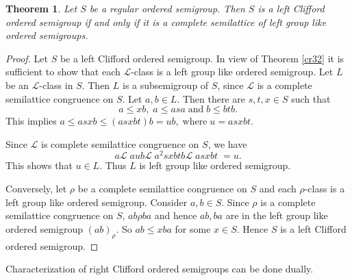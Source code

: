 \documentclass[13pt]{article}
\newtheorem{Theorem}[theorem]{Theorem}
\theoremstyle{definition}
\theoremstyle{remark}
\numberwithin{equation}{section}
\newcommand{\lc}{\mathcal{L}}
\begin{document}
\begin{Theorem}\label{cr33}
Let $S$ be a regular ordered  semigroup. Then $S$ is  a left
Clifford ordered semigroup if and only if it is a complete
semilattice of left group like ordered semigroups.
\end{Theorem}
\begin{proof}
Let $S$ be a  left Clifford ordered semigroup. In view of Theorem
\ref{cr32} it is sufficient to show that  each  $\lc$-class is a
left group like ordered semigroup. Let $L$ be an $\lc$-class in $S$.
Then $L$ is a subsemigroup of $S$, since $\lc $ is a  complete
semilattice congruence on $S$. Let $a, b \in L$. Then there are $s,
t, x \in S$ such that $$a \leq xb, \; a \leq asa \;\textrm{and} \;b
\leq btb.$$ This implies  $a \leq asxb \leq (asxbt)b =ub,
\;\textrm{where} \;u = asxbt$.

Since  $\lc$ is complete semilattice congruence on $S$, we have
$$a \lc \;aub \lc \;a^2s xb tb \lc \;as xbt \;=u. $$ This shows that
$u \in L$.  Thus $L$ is left group like ordered semigroup.

Conversely, let $\rho$ be a  complete semilattice  congruence on $S$
and each $\rho$-class is a left group like ordered semigroup.
Consider $a, b \in S$.  Since $\rho$ is a complete semilattice
congruence on $S$, $ab \rho ba$ and hence $ab, ba$ are in the left
group like ordered semigroup $(ab)_\rho$. So $ab \leq xba$ for some
$x \in S$.  Hence  $S$ is a left Clifford ordered semigroup.
\end{proof}

Characterization of right Clifford  ordered semigroups can be done
dually.









\end{document}
